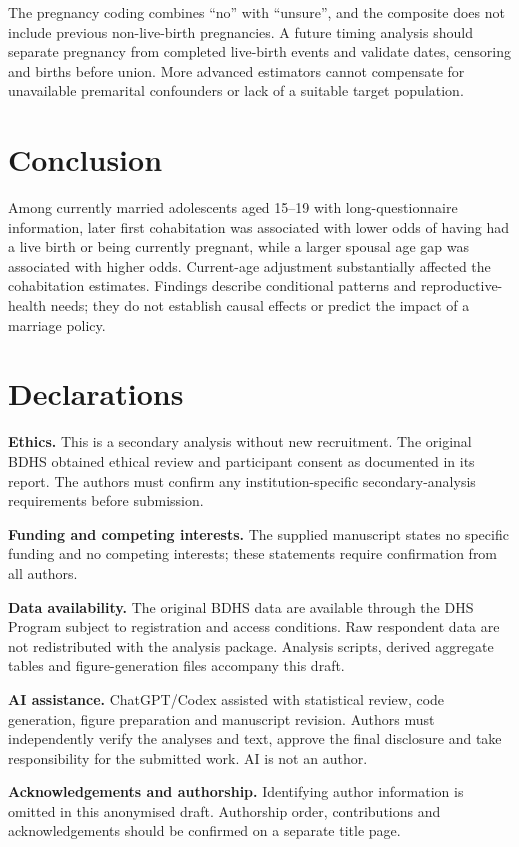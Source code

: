 \documentclass[11pt]{article}
\begin{document}
The pregnancy coding combines ``no'' with ``unsure'', and the composite does not include previous non-live-birth pregnancies. A future timing analysis should separate pregnancy from completed live-birth events and validate dates, censoring and births before union. More advanced estimators cannot compensate for unavailable premarital confounders or lack of a suitable target population.

\section{Conclusion}
Among currently married adolescents aged 15--19 with long-questionnaire information, later first cohabitation was associated with lower odds of having had a live birth or being currently pregnant, while a larger spousal age gap was associated with higher odds. Current-age adjustment substantially affected the cohabitation estimates. Findings describe conditional patterns and reproductive-health needs; they do not establish causal effects or predict the impact of a marriage policy.

\section*{Declarations}
\textbf{Ethics.} This is a secondary analysis without new recruitment. The original BDHS obtained ethical review and participant consent as documented in its report.\cite{bdhs} The authors must confirm any institution-specific secondary-analysis requirements before submission.

\textbf{Funding and competing interests.} The supplied manuscript states no specific funding and no competing interests; these statements require confirmation from all authors.

\textbf{Data availability.} The original BDHS data are available through the DHS Program subject to registration and access conditions. Raw respondent data are not redistributed with the analysis package. Analysis scripts, derived aggregate tables and figure-generation files accompany this draft.

\textbf{AI assistance.} ChatGPT/Codex assisted with statistical review, code generation, figure preparation and manuscript revision. Authors must independently verify the analyses and text, approve the final disclosure and take responsibility for the submitted work. AI is not an author.

\textbf{Acknowledgements and authorship.} Identifying author information is omitted in this anonymised draft. Authorship order, contributions and acknowledgements should be confirmed on a separate title page.
\end{document}
